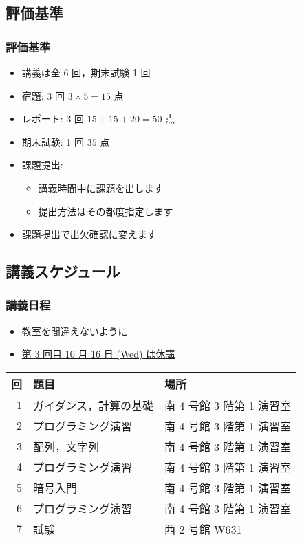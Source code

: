 \subsection{評価基準}
\begin{frame}
\frametitle{評価基準}
  \begin{itemize}
\item 講義は全 6 回，期末試験 1 回
\item 宿題: 3 回 \(3\times 5=15\) 点
\item レポート: 3 回 \(15+15+20=50\) 点
\item 期末試験: 1 回 \(35\) 点
\item 課題提出: 
    \begin{itemize}
\item 講義時間中に課題を出します
\item 提出方法はその都度指定します
    \end{itemize}
\item 課題提出で出欠確認に変えます
  \end{itemize}
\end{frame}
%
%
\subsection{講義スケジュール}
\begin{frame}
\frametitle{講義日程}
  \begin{itemize}
\item 教室を間違えないように
\item \underline{第 3 回目 10 月 16 日 (Wed) は休講}
  \end{itemize}
  \begin{center}
    \begin{tabular}{rll}
回&題目&場所\\
\hline
1&ガイダンス，計算の基礎& 南 4 号館 3 階第 1 演習室\\
2&プログラミング演習& 南 4 号館 3 階第 1 演習室\\
3&配列，文字列& 南 4 号館 3 階第 1 演習室\\
4&プログラミング演習& 南 4 号館 3 階第 1 演習室\\
5&暗号入門& 南 4 号館 3 階第 1 演習室\\
6&プログラミング演習& 南 4 号館 3 階第 1 演習室\\
7&試験& 西 2 号館 W631
    \end{tabular}
  \end{center}
\end{frame}
